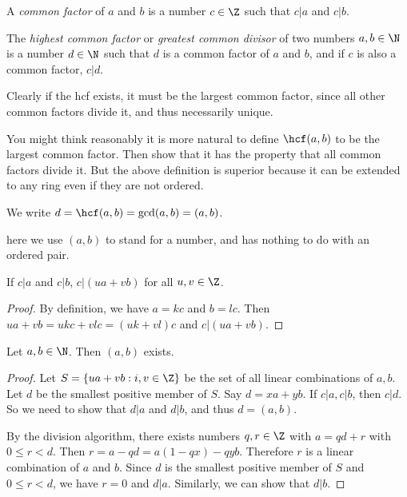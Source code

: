 \documentclass[a4paper]{article}
\begin{document}
  \begin{defi}
    A \emph{common factor} of $a$ and $b$ is a number $c\in\Z$ such that $c|a$ and $c|b$.
  \end{defi}

  \begin{defi}
    The \emph{highest common factor} or \emph{greatest common divisor} of two numbers $a, b\in \N$ is a number $d\in \N$ such that $d$ is a common factor of $a$ and $b$, and if $c$ is also a common factor, $c|d$.

    Clearly if the hcf exists, it must be the largest common factor, since all other common factors divide it, and thus necessarily unique.
  \end{defi}
  \note You might think reasonably it is more natural to define $\hcf(a, b)$ to be the largest common factor. Then show that it has the property that all common factors divide it. But the above definition is superior because it can be extended to any ring even if they are not ordered.

  \begin{notation}
    We write $d = \hcf(a, b) = \gcd(a, b) = (a, b)$.

    \note here we use $(a, b)$ to stand for a number, and has nothing to do with an ordered pair.
  \end{notation}

  \begin{prop}
    If $c|a$ and $c|b$, $c|(ua + vb)$ for all $u, v\in \Z$.
  \end{prop}

  \begin{proof}
    By definition, we have $a = kc$ and $b = lc$. Then $ua + vb = ukc + vlc = (uk + vl)c$ and $c|(ua + vb)$.
  \end{proof}

  \begin{thm}
    Let $a,b\in \N$. Then $(a, b)$ exists.
  \end{thm}

  \begin{proof}
    Let $S=\{ua + vb:i, v\in\Z\}$ be the set of all linear combinations of $a, b$. Let $d$ be the smallest positive member of $S$. Say $d = xa + yb$. If $c|a, c|b$, then $c|d$. So we need to show that $d|a$ and $d|b$, and thus $d=(a, b)$.

    By the division algorithm, there exists numbers $q, r\in\Z$ with $a = qd + r$ with $0\leq r < d$. Then $r = a - qd = a(1 - qx) - qyb$. Therefore $r$ is a linear combination of $a$ and $b$. Since $d$ is the smallest positive member of $S$ and $0\leq r < d$, we have $r = 0$ and $d|a$. Similarly, we can show that $d|b$.
  \end{proof}
\end{document}
